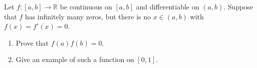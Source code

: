 \documentclass{article}
\begin{document}
\setlength{\parindent}{0pt}
Let $f\colon [a,b]\to\mathbb{R}$ be continuous on $[a,b]$ and differentiable on $(a,b)$. Suppose that $f$ has infinitely many zeros, but there is no $x\in(a,b)$ with $f(x)=f'(x)=0$.
\begin{enumerate}[label=(\alph*)]
\item Prove that $f(a)f(b)=0$.
\item Give an example of such a function on $[0,1]$.
\end{enumerate}
\end{document}
